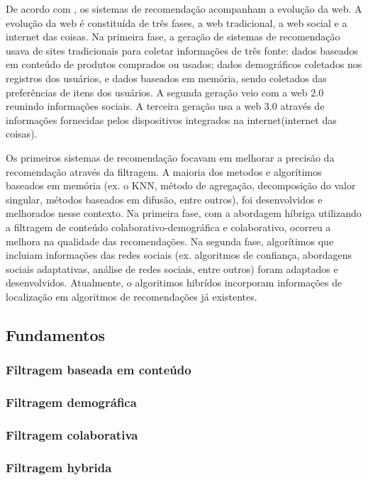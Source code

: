 De acordo com , os sistemas de recomendação 
acompanham a evolução da web. A evolução da web é constituída de três 
fases, a web tradicional, a web social e a internet das coisas. 
Na primeira fase, a geração de sistemas de recomendação usava de 
sites tradicionais para coletar informações de três fonte: dados 
baseados em conteúdo de produtos comprados ou usados; dados 
demográficos coletados nos registros dos usuários, e dados baseados em 
memória, sendo coletados das preferências de itens dos usuários. A segunda 
geração veio com a web 2.0 reunindo informações sociais. A terceira 
geração usa a web 3.0 através de informações fornecidas pelos dispositivos 
integrados na internet(internet das coisas).


Os primeiros sistemas de recomendação focavam em melhorar a precisão da 
recomendação através da filtragem. A maioria dos metodos e algorítimos 
baseados em memória (ex. o KNN, método de agregação, decomposição do valor 
singular, métodos baseados em difusão, entre outros), foi
desenvolvidos e melhorados nesse contexto. Na primeira fase, com a 
abordagem híbriga utilizando a filtragem de conteúdo 
colaborativo-demográfica e colaborativo, ocorreu a melhora na qualidade 
das recomendações. Na segunda fase, algorítimos que incluiam informações 
das redes sociais (ex. algoritmos de
confiança, abordagens sociais adaptativas, análise de redes sociais, 
entre outros) foram adaptados e 
desenvolvidos. Atualmente, o algoritimos hibrídos incorporam informações 
de localização em algoritmos de recomendações já existentes. 

\subsection{Fundamentos}

\subsubsection{Filtragem baseada em conteúdo}

\subsubsection{Filtragem demográfica}

\subsubsection{Filtragem colaborativa}

\subsubsection{Filtragem hybrida}


